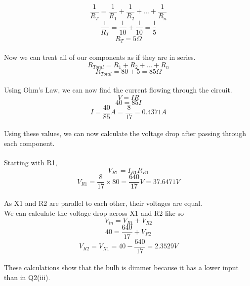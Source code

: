 \documentclass[12pt]{article}
\begin{document}
\[\frac{1}{R_T} = \frac{1}{R_1} + \frac{1}{R_2} + ... + \frac{1}{R_n}\]
\[\frac{1}{R_T} = \frac{1}{10} + \frac{1}{10} = \frac{1}{5}\]
\[R_T = 5\Omega \]\\
Now we can treat all of our components as if they are in series.\\
\[R_{Total} = R_1 + R_2 + ... + R_n\]
\[R_{Total} = 80 + 5 = 85\Omega\]\\
Using Ohm's Law, we can now find the current flowing through the circuit.\\
\[V = IR\]
\[40 = 85I\]
\[I = \frac{40}{85}A = \frac{8}{17} = 0.4371A\]\\
Using these values, we can now calculate the voltage drop after passing through each component.\\
\\
Starting with R1,\\
\[V_{R1} = I_{R1}R_{R1}\]
\[V_{R1} = \frac{8}{17} \times 80 = \frac{640}{17}V = 37.6471V\]\\
As X1 and R2 are parallel to each other, their voltages are equal.\\
We can calculate the voltage drop across X1 and R2 like so\\
\[V_{in} = V_{R1} + V_{R2}\]
\[40 = \frac{640}{17} + V_{R2}\]
\[V_{R2} = V_{X1} = 40 - \frac{640}{17} = 2.3529V\]\\
These calculations show that the bulb is dimmer because it has a lower input than in Q2(iii).\\
\\
\end{document}
